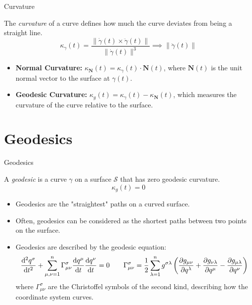 \documentclass{beamer}
\begin{document}
\begin{frame}{Curvature}
	\begin{definition}[Curvature]\label{def:curvature}
		The \emph{curvature} of a curve defines how much the curve deviates from being a straight line.
		\[
			\kappa_{\gamma}(t) = \frac{\|\dot{\gamma}(t) \times \ddot{\gamma}(t)\|}{\|\dot{\gamma}(t)\|^3} \implies \|\ddot{\gamma}(t)\|
		\]
	\end{definition}
	\vspace{1ex}
	\begin{itemize}[<+->]
		\item \textbf{Normal Curvature:} $\kappa_{\mathbf{N}}(t) = \kappa_{\gamma}(t) \cdot \mathbf{N}(t)$, where $\mathbf{N}(t)$ is the unit normal vector to the surface at $\gamma(t)$.
		\item \textbf{Geodesic Curvature:} $\kappa_{g}(t) = \kappa_{\gamma}(t) - \kappa_{\mathbf{N}}(t)$, which measures the curvature of the curve relative to the surface.
	\end{itemize}
\end{frame}

\section{Geodesics}
\begin{frame}{Geodesics}
	\footnotesize
	\begin{definition}[Geodesic]\label{def:geodesic}
		A \emph{geodesic} is a curve $\gamma$ on a surface $\mathcal{S}$ that has zero geodesic curvature.
		\[
			\kappa_{g}(t) = 0
		\]
	\end{definition}
	\vspace{1ex}
	\begin{itemize}[<+->]
		\item Geodesics are the "straightest" paths on a curved surface.
		\item Often, geodesics can be considered as the shortest paths between two points on the surface.
		\item Geodesics are described by the geodesic equation:
		\[
		    \dv[2]{q^\sigma}{t} + \sum_{\mu,\nu=1}^{n} \Gamma_{\mu\nu}^\sigma \dv{q^\mu}{t} \dv{q^\nu}{t} = 0 \qquad \Gamma_{\mu\nu}^\sigma = \frac{1}{2}\sum_{\lambda=1}^{n}g^{\sigma\lambda}\left(\pdv{g_{\mu\nu}}{q^\lambda} + \pdv{g_{\nu\lambda}}{q^\mu} - \pdv{g_{\mu\lambda}}{q^\nu}\right)
		\]
		where $\Gamma_{\mu\nu}^\sigma$ are the Christoffel symbols of the second kind, describing how the coordinate system curves.
	\end{itemize}
\end{frame}
\end{document}
